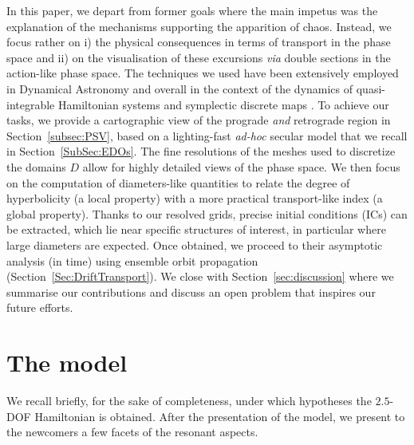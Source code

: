 \documentclass{amsart}
\theoremstyle{definition}
\theoremstyle{remark}
\numberwithin{equation}{section}
\begin{document}
In this paper, we depart from former goals where the main impetus was the explanation of the mechanisms supporting the apparition of chaos. Instead, we focus rather on i) {\color{black}the} physical consequences in terms of transport in the phase space and ii) on the visualisation of these excursions \textit{via}  double sections in the action-like {\color{black}phase space}.  The techniques we used have been extensively employed  
in Dynamical Astronomy and overall in the context of the dynamics of quasi-integrable Hamiltonian systems and symplectic discrete maps {\color{black}\citep[confer][just to name a few]{eLe03,nTo08,pCi08,riPa15,eLe16}}. 
To achieve our tasks, we provide a cartographic view of the prograde \textit{and} retrograde region in {\color{black}Section~\ref{subsec:PSV}, based on {\color{black}a} lighting-fast \textit{ad-hoc} secular model that we recall in Section~\ref{SubSec:EDOs}.} The fine resolutions of the meshes used to discretize the domains $D$ allow {\color{black}for highly detailed views of the phase space}. 
We then focus on the computation of diameters-like quantities to relate the degree of hyperbolicity (a local property) with a more practical transport-like index (a global property). Thanks to our resolved grids, 
precise initial conditions (ICs) {\color{black}can be extracted, which lie near specific structures of interest, in} particular where large diameters are expected. Once {\color{black}obtained,} we proceed to their asymptotic analysis (in time) {\color{black}using ensemble orbit propagation (Section~\ref{Sec:DriftTransport})}. We close with {\color{black}Section~\ref{sec:discussion}} where we summarise our contributions and discuss an open problem that {\color{black}inspires our future} efforts. 

 
\section{The model} 
We recall briefly, for the sake of completeness, under which hypotheses the $2.5$-DOF Hamiltonian is obtained. After the presentation of the model, we present to the newcomers a few facets of the resonant aspects. 

\end{document}
